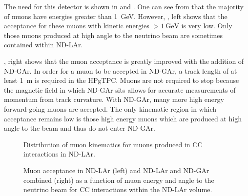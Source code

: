 The need for this detector is shown in  and .
One can see from  that the majority of muons have energies greater than \SI{1}{\giga\electronvolt}.
However, , left shows that the acceptance for these muons with kinetic energies $>\SI{1}{\giga\electronvolt}$ is very low.
Only those muons produced at high angle to the neutrino beam are sometimes contained within ND-LAr.

, right shows that the muon acceptance is greatly improved with the addition of ND-GAr.
In order for a muon to be accepted in ND-GAr, a track length of at least \SI{1}{\metre} is required in the HPgTPC.
Muons are not required to stop because the magnetic field in which ND-GAr sits allows for accurate measurements of momentum from track curvature.
With ND-GAr, many more high energy forward-going muons are accepted.
The only kinematic region in which acceptance remains low is those high energy muons which are produced at high angle to the beam and thus do not enter ND-GAr. 

\begin{figure}[h]
  \begin{adjustbox}{max totalsize={.7\textwidth}, center}
    
  \end{adjustbox}
  \caption[Muon kinematics in the DUNE ND]{Distribution of muon kinematics for muons produced in \numu CC interactions in ND-LAr.}
  \label{fig:muonKinematics}
\end{figure}

\begin{figure}[h]
  \begin{minipage}[t]{0.5\textwidth}
    \begin{adjustbox}{max totalsize={\textwidth}, center}
      
    \end{adjustbox}
  \end{minipage}
  \hfill
  \begin{minipage}[t]{0.5\textwidth}
    \begin{adjustbox}{max totalsize={\textwidth}, center}
      
    \end{adjustbox}
  \end{minipage}
  \caption[Muon acceptance in the DUNE ND]{Muon acceptance in ND-LAr (left) and ND-LAr and ND-GAr combined (right) as a function of muon energy and angle to the neutrino beam for \numu CC interactions within the ND-LAr volume.}
  \label{fig:muonAccND}
\end{figure}

